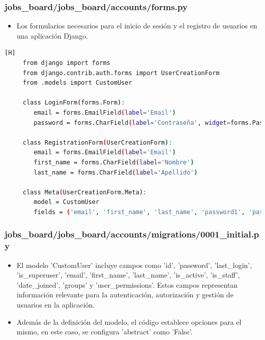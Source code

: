 \documentclass{article}
\begin{document}
 \subsubsection{jobs\_board/jobs\_board/accounts/forms.py}
    \begin{itemize}
        \item Los formularios necesarios para el inicio de sesión y el registro de usuarios en una aplicación Django.
    \end{itemize}
    \begin{lstlisting}[language=bash,caption={forms.py}][H]
     from django import forms
     from django.contrib.auth.forms import UserCreationForm
     from .models import CustomUser
     
     class LoginForm(forms.Form):
        email = forms.EmailField(label='Email')
        password = forms.CharField(label='Contraseña', widget=forms.PasswordInput)
        
     class RegistrationForm(UserCreationForm):
        email = forms.EmailField(label='Email')
        first_name = forms.CharField(label='Nombre')
        last_name = forms.CharField(label='Apellido')

     class Meta(UserCreationForm.Meta):
        model = CustomUser
        fields = ('email', 'first_name', 'last_name', 'password1', 'password2')
	\end{lstlisting}
    \subsubsection{jobs\_board/jobs\_board/accounts/migrations/0001\_initial.py}
    \begin{itemize}
        \item El modelo 'CustomUser' incluye campos como 'id', 'password', 'last\_login', 'is\_superuser', 'email', 'first\_name', 'last\_name', 'is\_active', 'is\_staff', 'date\_joined', 'groups' y 'user\_permissions'. Estos campos representan información relevante para la autenticación, autorización y gestión de usuarios en la aplicación.

        \item Además de la definición del modelo, el código establece opciones para el mismo, en este caso, se configura 'abstract' como 'False'.
    \end{itemize}
\end{document}
